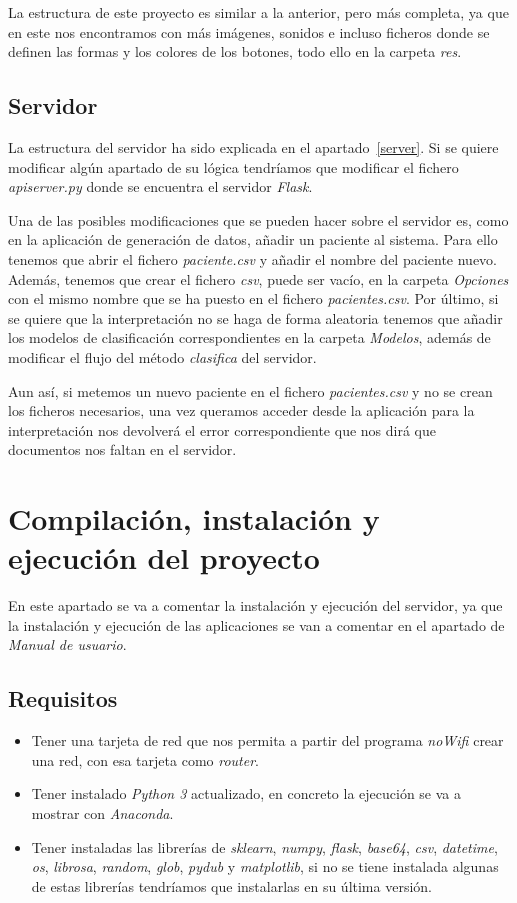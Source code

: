 La estructura de este proyecto es similar a la anterior, pero más completa, ya que en este nos encontramos con más imágenes, sonidos e incluso ficheros donde se definen las formas y los colores de los botones, todo ello en la carpeta \textit{res}.
\subsection{Servidor}
La estructura del servidor ha sido explicada en el apartado~\ref{server}. Si se quiere modificar algún apartado de su lógica tendríamos que modificar el fichero \textit{apiserver.py} donde se encuentra el servidor \textit{Flask}.

Una de las posibles modificaciones que se pueden hacer sobre el servidor es, como en la aplicación de generación de datos, añadir un paciente al sistema. Para ello tenemos que abrir el fichero \textit{paciente.csv} y añadir el nombre del paciente nuevo. Además, tenemos que crear el fichero \textit{csv}, puede ser vacío, en la carpeta \textit{Opciones} con el mismo nombre que se ha puesto en el fichero \textit{pacientes.csv}. Por último, si se quiere que la interpretación no se haga de forma aleatoria tenemos que añadir los modelos de clasificación correspondientes en la carpeta \textit{Modelos}, además de modificar el flujo del método \textit{clasifica} del servidor.

Aun así, si metemos un nuevo paciente en el fichero \textit{pacientes.csv} y no se crean los ficheros necesarios, una vez queramos acceder desde la aplicación para la interpretación nos devolverá el error correspondiente que nos dirá que documentos nos faltan en el servidor.
\section{Compilación, instalación y ejecución del proyecto}
En este apartado se va a comentar la instalación y ejecución del servidor, ya que la instalación y ejecución de las aplicaciones se van a comentar en el apartado de \textit{Manual de usuario}.

\subsection{Requisitos}
\begin{itemize}
	\item Tener una tarjeta de red que nos permita a partir del programa \textit{noWifi} crear una red, con esa tarjeta como \textit{router}.
	\item Tener instalado \textit{Python 3} actualizado, en concreto la ejecución se va a mostrar con \textit{Anaconda}.
	\item Tener instaladas las librerías de \textit{sklearn}, \textit{numpy}, \textit{flask}, \textit{base64}, \textit{csv}, \textit{datetime}, \textit{os}, \textit{librosa}, \textit{random}, \textit{glob}, \textit{pydub} y \textit{matplotlib}, si no se tiene instalada algunas de estas librerías tendríamos que instalarlas en su última versión.
\end{itemize}

